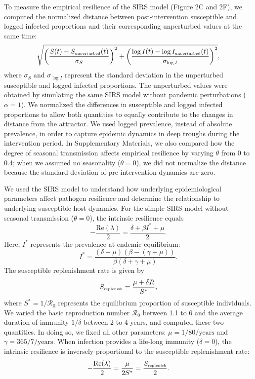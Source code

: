 \documentclass[12pt]{article}
\newcommand{\comment}{\showcomment}
\newcommand{\showcomment}[3]{\textcolor{#1}{\textbf{[#2: }\textsl{#3}\textbf{]}}}
\newcommand{\swp}[1]{\comment{magenta}{SWP}{#1}}
\newcommand{\tsub}[2]{#1_{{\textrm{\tiny #2}}}}
\begin{document}
To measure the empirical resilience of the SIRS model (Figure 2C and 2F), we computed the normalized distance between post-intervention susceptible and logged infected proportions and their corresponding unperturbed values at the same time:
\begin{equation}
\sqrt{\left(\frac{S(t) - \tsub{S}{unperturbed}(t)}{\sigma_S}\right)^2 + \left(\frac{\log I(t) - \log \tsub{I}{unperturbed}(t)}{\sigma_{\log I}}\right)^2},
\end{equation}
where $\sigma_S$ and $\sigma_{\log I}$ represent the standard deviation in the unperturbed susceptible and logged infected proportions.
The unperturbed values were obtained by simulating the same SIRS model without pandemic perturbations ($\alpha = 1$).
We normalized the differences in susceptible and logged infected proportions to allow both quantities to equally contribute to the changes in distance from the attractor.
We used logged prevalence, instead of absolute prevalence, in order to capture epidemic dynamics in deep troughs during the intervention period.
In Supplementary Materials, we also compared how the degree of seasonal transmission affects empirical resilience by varying $\theta$ from 0 to 0.4; when we assumed no seasonality ($\theta = 0$), we did not normalize the distance because the standard deviation of pre-intervention dynamics are zero. 

We used the SIRS model to understand how underlying epidemiological parameters affect pathogen resilience and determine the relationship to underlying susceptible host dynamics.
For the simple SIRS model without seasonal transmission ($\theta = 0$), the intrinsic resilience equals
\begin{equation}
-\frac{\mathrm{Re}(\lambda)}{2} = \frac{\delta + \beta I^{\ast} + \mu}{2}.
\end{equation}
Here, $I^{\ast}$ represents the prevalence at endemic equilibrium:
\begin{equation}
I^{\ast} = \frac{(\delta + \mu)(\beta - (\gamma + \mu))}{\beta(\delta + \gamma + \mu)}.
\end{equation}
The susceptible replenishment rate is given by
\begin{equation}
\tsub{S}{replenish} = \frac{\mu + \delta R}{S^\ast},
\end{equation}
where $S^\ast = 1/\mathcal R_0$ represents the equilibrium proportion of susceptible individuals.
We varied the basic reproduction number $\mathcal R_0$ between 1.1 to 6 and the average duration of immunity $1/\delta$ between 2 to 4 years, and computed these two quantities.
In doing so, we fixed all other parameters: $\mu=1/80/\mathrm{years}$ and $\gamma=365/7/\mathrm{years}$.
When infection provides a life-long immunity ($\delta = 0$), the intrinsic resilience is inversely proportional to the susceptible replenishment rate:
\begin{equation}
-\frac{\mathrm{Re}(\lambda)}{2} = \frac{\mu}{2 S^\ast} = \frac{\tsub{S}{replenish}}{2}.
\end{equation}
\end{document}
